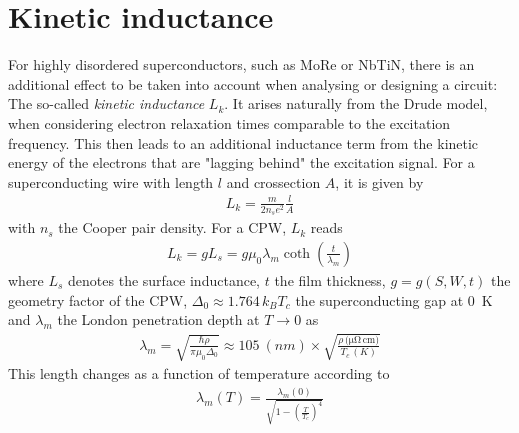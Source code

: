 \section{Kinetic inductance}
For highly disordered superconductors, such as MoRe or NbTiN, there is an additional effect to be taken into account when analysing or designing a circuit: The so-called \textit{kinetic inductance} $L_k$. It arises naturally from the Drude model, when considering electron relaxation times comparable to the excitation frequency. This then leads to an additional inductance term from the kinetic energy of the electrons that are "lagging behind" the excitation signal. For a superconducting wire with length $l$ and crossection $A$, it is given by
\begin{eqnarray}
L_k = \frac{m}{2n_s e^2}\frac{l}{A}
\end{eqnarray}
with $n_s$ the Cooper pair density. For a CPW, $L_k$ reads
\begin{eqnarray}
L_k = g L_s = g\mu_0\lambda_m\coth\left(\frac{t}{\lambda_m}\right)
\end{eqnarray}
where $L_s$ denotes the surface inductance, $t$ the film thickness, $g=g(S,W,t)$ the geometry factor of the CPW, $\Delta_0\approx1.764\,k_BT_c$ the superconducting gap at \SI{0}{K} and $\lambda_m$ the London penetration depth at $T\rightarrow0$ as
\begin{eqnarray}
\lambda_m=\sqrt{\frac{\hbar\rho}{\pi\mu_0\Delta_0}}\approx\SI{105}{(nm)}\times\sqrt{\frac{\rho\si{\,(\micro\ohm\,\centi\metre)}}{T_c \si{\,(K)}}}
\end{eqnarray}
This length changes as a function of temperature according to
\begin{eqnarray}
\lambda_m(T) = \frac{\lambda_m(0)}{\sqrt{1-\left(\frac{T}{T_c}\right)^4}}
\end{eqnarray}